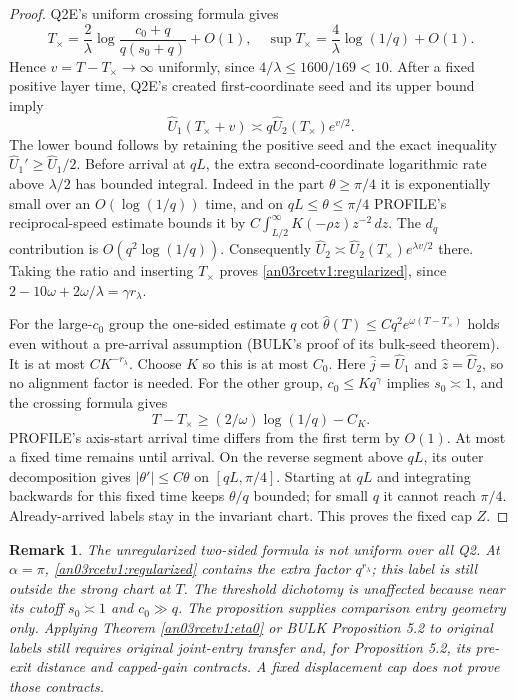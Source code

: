 \documentclass[11pt]{article}
\newtheorem{remark}[theorem]{Remark}
\newcommand{\dd}{\,d}
\begin{document}
\begin{proof}
Q2E's uniform crossing formula gives
\[
 T_\times=\frac2\lambda\log\frac{c_0+q}{q(s_0+q)}+O(1),
 \quad \sup T_\times=\frac4\lambda\log(1/q)+O(1).
\]
Hence $v=T-T_\times\to\infty$ uniformly, since
$4/\lambda\le1600/169<10$. After a fixed positive layer time,
Q2E's created first-coordinate seed and its upper bound imply
\[
 \widehat U_1(T_\times+v)\asymp
 q\widehat U_2(T_\times)e^{v/2}.
\]
The lower bound follows by retaining the positive seed and the
exact inequality $\widehat U_1'\ge\widehat U_1/2$.
Before arrival at $qL$, the extra second-coordinate logarithmic
rate above $\lambda/2$ has bounded integral. Indeed in the part
$\theta\ge\pi/4$ it is exponentially small over an $O(\log(1/q))$
time, and on $qL\le\theta\le\pi/4$ PROFILE's reciprocal-speed
estimate bounds it by
$C\int_{L/2}^\infty K(-\rho z)z^{-2}\dd z$.
The $d_q$ contribution is $O(q^2\log(1/q))$.
Consequently $\widehat U_2\asymp
\widehat U_2(T_\times)e^{\lambda v/2}$ there. Taking the ratio
and inserting $T_\times$ proves \eqref{an03rcetv1:regularized}, since
$2-10\omega+2\omega/\lambda=\gamma r_\lambda$.

For the large-$c_0$ group the one-sided estimate
$q\cot\widehat\theta(T)\le Cq^2e^{\omega(T-T_\times)}$
holds even without a pre-arrival assumption (BULK's proof of its
bulk-seed theorem). It is at most $CK^{-r_\lambda}$.
Choose $K$ so this is at most $C_0$. Here $\widehat j=\widehat U_1$
and $\widehat z=\widehat U_2$, so no alignment factor is needed.
For the other group, $c_0\le Kq^\gamma$ implies $s_0\asymp1$,
and the crossing formula gives
\[
 T-T_\times\ge(2/\omega)\log(1/q)-C_K.
\]
PROFILE's axis-start arrival time differs from the first term by
$O(1)$. At most a fixed time remains until arrival. On the reverse
segment above $qL$, its outer decomposition gives
$|\theta'|\le C\theta$ on $[qL,\pi/4]$. Starting at $qL$ and
integrating backwards for this fixed time keeps $\theta/q$ bounded;
for small $q$ it cannot reach $\pi/4$. Already-arrived labels stay
in the invariant chart. This proves the fixed cap $Z$.
\end{proof}

\begin{remark}\label{an03rcetv1:endpoint}
The unregularized two-sided formula is not uniform over all Q2.
At $\alpha=\pi$, \eqref{an03rcetv1:regularized} contains the extra
factor $q^{r_\lambda}$; this label is still outside the strong chart
at $T$. The threshold dichotomy is unaffected because near its
cutoff $s_0\asymp1$ and $c_0\gg q$. The proposition supplies
comparison entry geometry only. Applying Theorem
\ref{an03rcetv1:eta0} or BULK Proposition 5.2 to original labels still
requires original joint-entry transfer and, for Proposition 5.2,
its pre-exit distance and capped-gain contracts. A fixed displacement
cap does not prove those contracts.
\end{remark}
\end{document}
